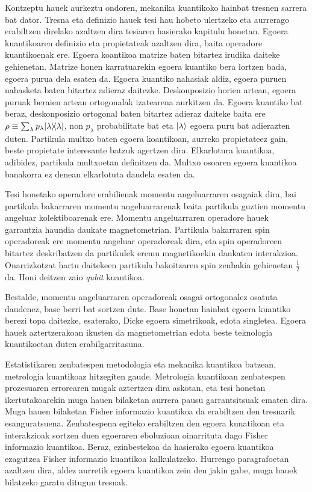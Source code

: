 Kontzeptu hauek aurkeztu ondoren, mekanika kuantikoko hainbat tresnen sarrera bat dator.
Tresna eta definizio hauek tesi hau hobeto ulertzeko eta aurrerago erabiltzen direlako azaltzen dira tesiaren hasierako kapitulu honetan.
Egoera kuantikoaren definizio eta propietateak azaltzen dira, baita operadore kuantikoenak ere.
Egoera koantikoa matrize baten bitartez irudika daiteke gehienetan.
Matrize honen karratuarekin egoera kuantiko bera lortzen bada, egoera purua dela esaten da.
Egoera kuantiko nahasiak aldiz, egoera puruen nahasketa baten bitartez adieraz daitezke.
Deskonposizio horien artean, egoera puruak beraien artean ortogonalak izatearena aurkitzen da.
Egoera kuantiko bat beraz, deskonposizio ortogonal baten bitartez adieraz daiteke baita ere $\rho\equiv\sum_\lambda p_\lambda \vert{\lambda}\rangle{\!}\langle{\lambda}\vert$, non $p_\lambda$ probabilitate bat eta $\vert{\lambda}\rangle$ egoera puru bat adierazten duten.
Partikula multxo baten egoera koantikoan, aurreko propietateez gain, beste propietate interesante batzuk agertzen dira.
Elkarlotura kuantikoa, adibidez, partikula multxoetan definitzen da.
Multxo osoaren egoera kuantikoa banakorra ez denean elkarlotuta daudela esaten da.

Tesi honetako operadore erabilienak momentu angeluarraren osagaiak dira, bai partikula bakarraren momentu angeluarrarenak baita partikula guztien momentu angeluar kolektiboarenak ere.
Momentu angeluarraren operadore hauek garrantzia haundia daukate magnetometrian.
Partikula bakarraren spin operadoreak ere momentu angeluar operadoreak dira, eta spin operadoreen bitartez deskribatzen da partikulek eremu magnetikoekin daukaten interakzioa.
Onarrizkotzat hartu daitekeen partikula bakoitzaren spin zenbakia gehienetan $\frac{1}{2}$ da.
Honi deitzen zaio \emph{qubit} kuantikoa.

Bestalde, momentu angeluarraren operadoreak osagai ortogonalez osatuta daudenez, base berri bat sortzen dute.
Base honetan hainbat egoera kuantiko berezi topa daitezke, esaterako, Dicke egoera simetrikoak, edota singletea.
Egoera hauek aztertzerakoan ikusten da magnetometrian edota beste teknologia kuantikoetan duten erabilgarritasuna.

Estatistikaren zenbatespen metodologia eta mekanika kuantikoa batzean, metrologia kuantikoaz hitzegiten gaude.
Metrologia kuantikoan zenbatespen prozesuaren errorearen mugak aztertzen dira askotan, eta tesi honetan ikertutakoarekin muga hauen bilaketan aurrera pausu garrantsitsuak ematen dira.
Muga hauen bilaketan Fisher informazio kuantikoa da erabiltzen den tresnarik esanguratsuena.
Zenbatespena egiteko erabiltzen den egoera kunatikoan eta interakzioak sortzen duen egoeraren eboluzioan oinarrituta dago Fisher informazio kuantikoa.
Beraz, ezinbestekoa da hasierako egoera kuantikoa ezagutzea Fisher informazio kuantikoa kalkulatzeko.
Hurrengo paragrafoetan azaltzen dira, aldez aurretik egoera kuantikoa zein den jakin gabe, muga hauek bilatzeko garatu ditugun tresnak.

